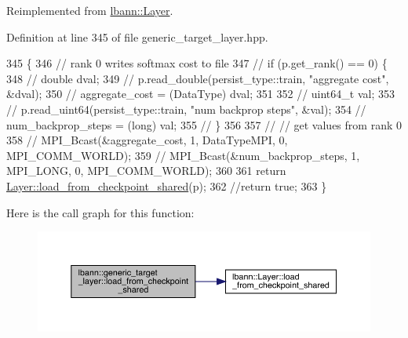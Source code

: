 Reimplemented from \hyperlink{classlbann_1_1Layer_a9e262970ecc64166e8b6610e2502ad30}{lbann\+::\+Layer}.



Definition at line 345 of file generic\+\_\+target\+\_\+layer.\+hpp.


\begin{DoxyCode}
345                                                         \{
346     \textcolor{comment}{// rank 0 writes softmax cost to file}
347     \textcolor{comment}{// if (p.get\_rank() == 0) \{}
348     \textcolor{comment}{//     double dval;}
349     \textcolor{comment}{//     p.read\_double(persist\_type::train, "aggregate cost", &dval);}
350     \textcolor{comment}{//     aggregate\_cost = (DataType) dval;}
351 
352     \textcolor{comment}{//     uint64\_t val;}
353     \textcolor{comment}{//     p.read\_uint64(persist\_type::train, "num backprop steps", &val);}
354     \textcolor{comment}{//     num\_backprop\_steps = (long) val;}
355     \textcolor{comment}{// \}}
356 
357     \textcolor{comment}{// // get values from rank 0}
358     \textcolor{comment}{// MPI\_Bcast(&aggregate\_cost, 1, DataTypeMPI, 0, MPI\_COMM\_WORLD);}
359     \textcolor{comment}{// MPI\_Bcast(&num\_backprop\_steps, 1, MPI\_LONG, 0, MPI\_COMM\_WORLD);}
360 
361     \textcolor{keywordflow}{return} \hyperlink{classlbann_1_1Layer_a9e262970ecc64166e8b6610e2502ad30}{Layer::load\_from\_checkpoint\_shared}(p);
362     \textcolor{comment}{//return true;}
363   \}
\end{DoxyCode}
Here is the call graph for this function\+:\nopagebreak
\begin{figure}[H]
\begin{center}
\leavevmode
\includegraphics[width=350pt]{classlbann_1_1generic__target__layer_af7d73f9e77b99b6a8b204cbda512726f_cgraph}
\end{center}
\end{figure}
\mbox{\label{classlbann_1_1generic__target__layer_a2d9f6ac689171acf0caceed3ed4f7ef9}} 
